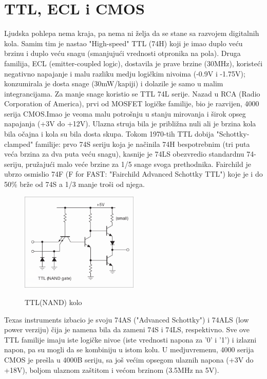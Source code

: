 \documentclass[12pt,a4paper]{article}
\begin{document}
\section{TTL, ECL i CMOS}
Ljudska pohlepa nema kraja, pa nema ni želja da se stane sa razvojem digitalnih kola.
Samim tim je nastao "High-speed" TTL (74H) koji je imao duplo veću brzinu i duplo veću snagu (smanjujući vrednosti otpronika na pola).\cite{art}
Druga familija, ECL (emitter-coupled logic), dostavila je prave brzine (30MHz), koristeći negativno napajanje i malu razliku medju logičkim nivoima (-0.9V i -1.75V); konzumirala je dosta snage (30mW/kapiji) i dolazile je samo u malim integrancijama.
Za manje snage koristio se TTL 74L serije. 
Nazad u RCA (Radio Corporation of America), prvi od MOSFET logičke familije, bio je razvijen, 4000 serija CMOS.Imao je veoma malu potrošnju u stanju mirovanja i širok opseg napajanja (+3V do +12V). Ulazna struja bila je približna nuli ali je brzina kola bila očajna i kola su bila dosta skupa.
Tokom 1970-tih TTL dobija "Schottky-clamped" familije: prvo 74S seriju koja je načinila 74H bespotrebnim (tri puta veća brzina za dva puta veću snagu), kasnije je 74LS obezvredio standardnu 74-seriju, pružajući malo veće brzine za 1/5 snage svoga prethodnika. 
Fairchild je ubrzo osmislio 74F (F for FAST: "Fairchild Advanced Schottky TTL") koje je i do 50\% brže od 74S a 1/3 manje troši od njega.
\begin{figure}[h]
  \centering
  \includegraphics[width=0.5\textwidth]{TTL(NAND).png}
  \caption{TTL(NAND) kolo}\cite{art}
\end{figure}
\newline
Texas instruments izbacio je svoju 74AS ("Advanced Schottky") i 74ALS (low power verziju) čija je namena bila da zameni 74S i 74LS, respektivno. 
Sve ove TTL familije imaju iste logičke nivoe (iste vrednosti napona za '0' i '1') i izlazni napon, pa su mogli da se kombiniju u istom kolu.\cite{art}
U medjuvremenu, 4000 serija CMOS je prešla u 4000B seriju, sa još većim opsegom ulaznih napona (+3V do +18V), boljom ulaznom zaštitom i većom brzinom (3.5MHz na 5V). 
\end{document}
